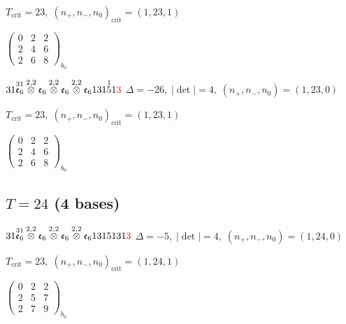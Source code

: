 \documentclass[10pt]{article}
\begin{document}
\hspace{1em}$T_{\text{crit}}=23,\; (n_+,n_-,n_0)_{\text{crit}}=(1,23,1)$

\hspace{2em}$\left(\begin{smallmatrix}0 & 2 & 2 \\ 2 & 4 & 6 \\ 2 & 6 & 8\end{smallmatrix}\right)_{\!b_0}$

\smallskip

$31\overset{31}{\mathfrak{e}_6}\overset{2,2}{\otimes}\mathfrak{e}_6\overset{2,2}{\otimes}\mathfrak{e}_6\overset{2,2}{\otimes}\mathfrak{e}_6131\overset{1}{5}1\textcolor{red}{3}$ \quad $\Delta=-26,\; |\det|=4,\; (n_+,n_-,n_0)=(1,23,0)$

\hspace{1em}$T_{\text{crit}}=23,\; (n_+,n_-,n_0)_{\text{crit}}=(1,23,1)$

\hspace{2em}$\left(\begin{smallmatrix}0 & 2 & 2 \\ 2 & 4 & 6 \\ 2 & 6 & 8\end{smallmatrix}\right)_{\!b_0}$


\subsection*{$T = 24$ \quad (4 bases)}
\smallskip

$31\overset{31}{\mathfrak{e}_6}\overset{2,2}{\otimes}\mathfrak{e}_6\overset{2,2}{\otimes}\mathfrak{e}_6\overset{2,2}{\otimes}\mathfrak{e}_61315131\textcolor{red}{3}$ \quad $\Delta=-5,\; |\det|=4,\; (n_+,n_-,n_0)=(1,24,0)$

\hspace{1em}$T_{\text{crit}}=23,\; (n_+,n_-,n_0)_{\text{crit}}=(1,24,1)$

\hspace{2em}$\left(\begin{smallmatrix}0 & 2 & 2 \\ 2 & 5 & 7 \\ 2 & 7 & 9\end{smallmatrix}\right)_{\!b_0}$
\end{document}
